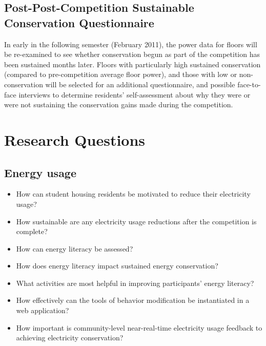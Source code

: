 \subsection{Post-Post-Competition Sustainable Conservation Questionnaire}

In early in the following semester (February 2011), the power data for floors will be re-examined to see whether conservation begun as part of the competition has been sustained months later. Floors with particularly high sustained conservation (compared to pre-competition average floor power), and those with low or non-conservation will be selected for an additional questionnaire, and possible face-to-face interviews to determine residents' self-assessment about why they were or were not sustaining the conservation gains made during the competition.

\section{Research Questions}

\subsection{Energy usage}


\begin{itemize}

\item How can student housing residents be motivated to reduce their electricity usage?

\item How sustainable are any electricity usage reductions after the competition is complete?

\item How can energy literacy be assessed?

\item How does energy literacy impact sustained energy conservation?

\item What activities are most helpful in improving participants' energy literacy?

\item How effectively can the tools of behavior modification be instantiated in a web application?

\item How important is community-level near-real-time electricity usage feedback to achieving electricity conservation?

\end{itemize}


